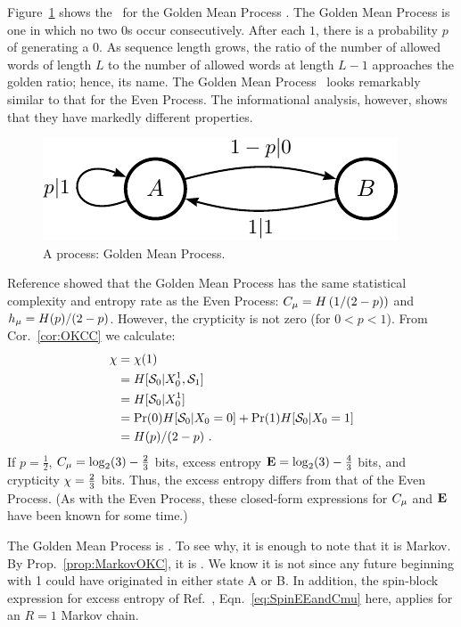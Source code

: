 Figure~\ref{fig:GoldenMean} shows the \eM\ for the Golden Mean Process
\cite{Crut01a}.
The Golden Mean Process is one in which no two $0$s occur consecutively. After
each $1$, there is a probability $p$ of generating a $0$. As sequence length
grows, the ratio of the number of allowed words of length $L$ to the number
of allowed words at length $L-1$ approaches the golden ratio; hence, its name.
The Golden Mean Process \eM\ looks remarkably similar to that for the Even
Process. The informational analysis, however, shows that they have markedly
different properties.

\begin{figure}[th]
\centering
\includegraphics{../chapter3/figures/goldenmean}
\caption{A  process: Golden Mean Process.
  }
\label{fig:GoldenMean}
\end{figure}

Reference \cite{Crut08b} showed that the Golden Mean Process has the same
statistical complexity and entropy rate as the Even Process:
$C_\mu = H \left( 1/(2-p) \right)$ and $h_\mu = H(p)/(2-p)$. However, the
crypticity is not zero (for $0 < p < 1$). From Cor.~\ref{cor:OKCC} we calculate:
\begin{align*}
\chi & = \chi(1) \\
    & = H[\mathcal{S}_0 | {X}_0^1, \mathcal{S}_1] \\
	& = H[\mathcal{S}_0 | {X}_0^1]\\
	& = \Pr(0) H[\mathcal{S}_0 | {X}_0 = 0]
		+ \Pr(1) H[\mathcal{S}_0 | {X}_0 = 1]\\
    & = H(p)/(2-p) ~.
\end{align*}
If $p = \frac{1}{2}$, $C_\mu = \log_2 (3)-\frac{2}{3}$ bits, excess
entropy ${\bf E} = \log_2 (3)-\frac{4}{3}$ bits, and crypticity
$\chi = \frac{2}{3}$ bits. Thus, the excess entropy
differs from that of the Even Process. (As with
the Even Process, these closed-form expressions for $C_\mu$ and ${\bf E}$ have been
known for some time.)

The Golden Mean Process is . To see why, it is enough to note
that it is  Markov. By Prop.~\ref{prop:MarkovOKC}, it is .
We know it is not  since any future beginning with 1 could 
have originated in either state A or B. In addition, the spin-block expression
for excess entropy of Ref.~\cite{Crut01a}, Eqn.~\ref{eq:SpinEEandCmu} here,
applies for an $R = 1$ Markov chain.

